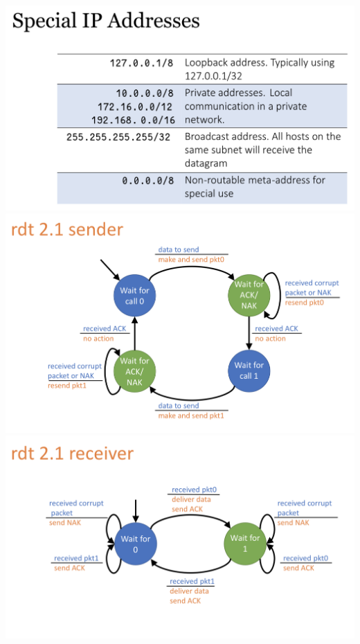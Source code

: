 \documentclass[a4paper]{article} \usepackage[backend=biber, style=numeric, sorting=none]{biblatex}
\begin{document}
\begin{multicols*}{4}
{\centering \includegraphics[scale=0.17]{special_ip_addresses}}
{\centering \includegraphics[scale=0.27]{rdt_2_1_sender}}
{\centering \includegraphics[scale=0.27]{rdt_2_1_receiver}}

\end{multicols*}
\end{document}

